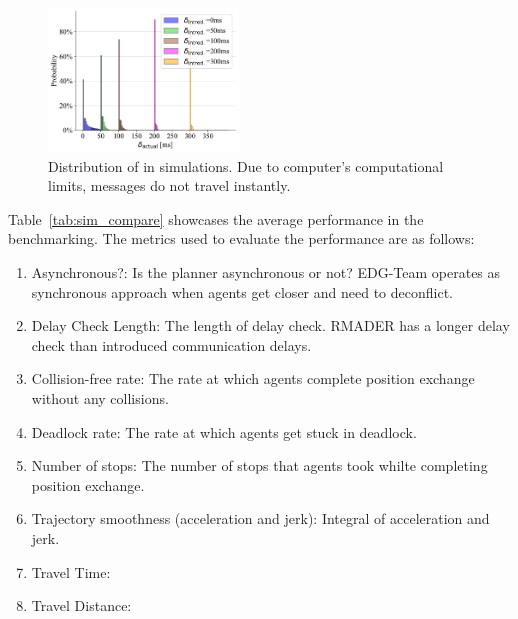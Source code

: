 \begin{figure}
    \centering
    \includegraphics[width=0.45\textwidth]{figures/rmader_comm_delay_histogram_all_included.pdf}
    \caption[Distribution of \delayActual{} in simulations]{Distribution of \delayActual{} in simulations. Due to computer’s computational limits, messages do not travel instantly.} 
    \label{fig:sim_actual_comm_delay}
\end{figure}

Table~\ref{tab:sim_compare} showcases the average performance in the benchmarking. The metrics used to evaluate the performance are as follows:
\begin{enumerate}
    \item Asynchronous?: Is the planner asynchronous or not? EDG-Team operates as synchronous approach when agents get closer and need to deconflict.
    \item Delay Check Length: The length of delay check. RMADER has a longer delay check than introduced communication delays.
    \item Collision-free rate: The rate at which agents complete position exchange without any collisions.
    \item Deadlock rate: The rate at which agents get stuck in deadlock.
    \item Number of stops: The number of stops that agents took whilte completing position exchange.
    \item Trajectory smoothness (acceleration and jerk): Integral of acceleration and jerk.
    \item Travel Time: 
    \item Travel Distance:
\end{enumerate}

